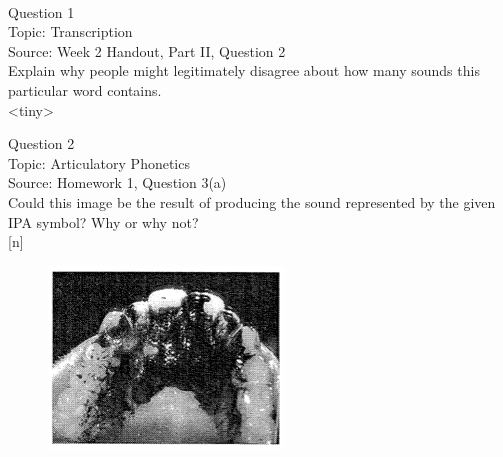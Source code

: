 \documentclass[12pt]{article}
\begin{document}
\newpage

\begin{center}
\textbf{{\color{red}{\HUGE END OF EXAM}}}\\

\end{center}
\newpage

\begin{center}
\textbf{{\color{blue}{\HUGE START OF EXAM\\}}}

\textbf{{\color{blue}{\HUGE Student ID: 74431\\}}}

\textbf{{\color{blue}{\HUGE \\}}}

\end{center}
\newpage

{\large Question 1}\\

Topic: Transcription\\
Source: Week 2 Handout, Part II, Question 2\\

Explain why people might legitimately disagree about how many sounds this particular word contains.\\

<tiny>


\newpage

{\large Question 2}\\

Topic: Articulatory Phonetics\\
Source: Homework 1, Question 3(a)\\

Could this image be the result of producing the sound represented by the given IPA symbol? Why or why not?\\

{[n]}

\begin{figure}[H]
\includegraphics{../images/staticpalatography_stop.png}
\end{figure}
\end{document}
